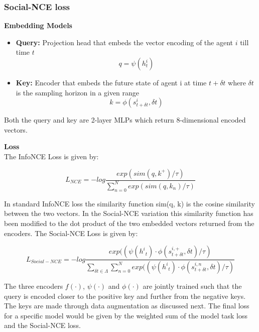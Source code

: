 \subsubsection {Social-NCE loss}
{\bf{Embedding Models}}

\begin{itemize}
  \setlength{\itemindent}{-1em}    
  \item \textbf{Query:} Projection head that embeds the vector encoding of the agent $i$ till time $t$
  \begin{equation}
    q = \psi(h^{i}_{t})
  \end{equation}
  \item \textbf{Key:} Encoder that embeds the future state of agent i at time $t + {\delta}t$ where ${\delta}t$ is the sampling horizon in a given range
  \begin{equation}
  k = \phi(s^{i}_{t+{\delta}t}, {\delta}t)
  \end{equation}
\end{itemize}
  
Both the query and key are 2-layer MLPs which return 8-dimensional encoded vectors.


{\bf{Loss}}
\\
The InfoNCE Loss \cite{pmlr-v9-gutmann10a} is given by: 

\begin{equation}
L_{NCE} = -log\frac{exp(sim(q,k^+)/\tau)}{\sum_{n=0}^{N} exp(sim(q, k_n)/\tau)}
\end{equation}


In standard InfoNCE loss the similarity function sim(q, k) is the cosine similarity between the two vectors. In the Social-NCE variation this similarity function has been modified to the dot product of the two embedded vectors returned from the encoders. The Social-NCE Loss is given by: 
\begin{mdframed}
\begin{equation}
L_{Social-NCE} = -log\frac{exp((\psi({h^i}_t){\cdot}\phi(s^{i,+}_{t+{\delta}t}, {\delta}t)/\tau)}{\sum_{{\delta}t \in \Lambda}\sum_{n=0}^{N} exp((\psi({h^i}_t){\cdot}\phi(s^{i,n}_{t+{\delta}t}, {\delta}t)/\tau)}
\end{equation}
\end{mdframed}

The three encoders $f(\cdot)$, $\psi(\cdot)$ and $\phi(\cdot)$ are jointly trained such that the query is encoded closer to the positive key and further from the negative keys. The keys are made through data augmentation as discussed next. The final loss for a specific model would be given by the weighted sum of the model task loss and the Social-NCE loss.

